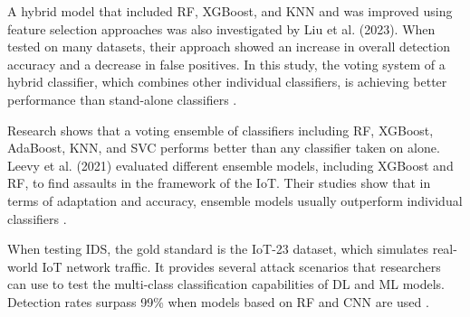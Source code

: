 
A hybrid model that included RF, XGBoost, and KNN and was improved using feature selection approaches was also investigated by Liu et al. (2023). When tested on many datasets, their approach showed an increase in overall detection accuracy and a decrease in false positives. In this study, the voting system of a hybrid classifier, which combines other individual classifiers, is achieving better performance than stand-alone classifiers \cite{liu2023hybrid}.


Research shows that a voting ensemble of classifiers including RF, XGBoost, AdaBoost, KNN, and SVC performs better than any classifier taken on alone. Leevy et al. (2021) evaluated different ensemble models, including XGBoost and RF, to find assaults in the framework of the IoT. Their studies show that in terms of adaptation and accuracy, ensemble models usually outperform individual classifiers \cite{leevy2021detecting}.


When testing IDS, the gold standard is the IoT-23 dataset, which simulates real-world IoT network traffic. It provides several attack scenarios that researchers can use to test the multi-class classification capabilities of DL and ML models. Detection rates surpass 99\% when models based on RF and CNN are used \cite{derhab2020intrusion}.

